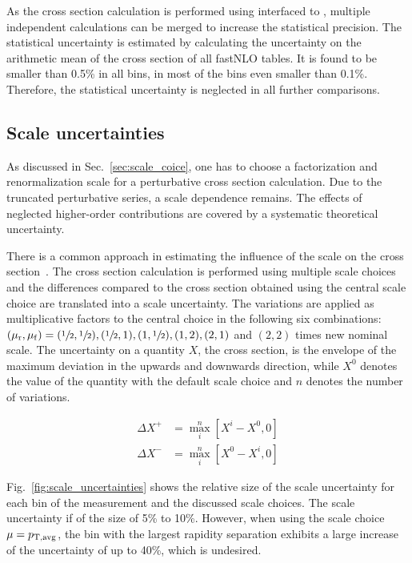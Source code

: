 As the cross section calculation is performed using \fastNLO interfaced to
\NLOJETPP, multiple independent calculations can be merged to increase the
statistical precision. The statistical uncertainty is estimated by calculating
the uncertainty on the arithmetic mean of the cross section of all fastNLO
tables. It is found to be smaller than 0.5\% in all
bins, in most of the bins even smaller than 0.1\%. Therefore, the statistical
uncertainty is neglected in all further comparisons.

\subsection{Scale uncertainties}
\label{sec:scale_uncertainties}

As discussed in Sec.~\ref{sec:scale_coice}, one has to choose a factorization
and renormalization scale for a perturbative cross section calculation. Due to
the truncated perturbative series, a scale dependence remains. The effects of
neglected higher-order contributions are covered by a systematic theoretical
uncertainty.

There is a common approach in estimating the influence of the scale on the cross
section~\cite{Cacciari:2003fi}. The cross section calculation is performed using
multiple scale choices and the differences compared to the cross section
obtained using the central scale choice are translated into a scale uncertainty.
The variations are applied as multiplicative factors to the central choice in
the following six combinations: $(\mu_{\mathrm{r}}, \mu_{\mathrm{f}}) = (\sfrac{1}{2}, \sfrac{1}{2}),
(\sfrac{1}{2}, 1), (1, \sfrac{1}{2}), (1, 2), (2, 1)$ and $(2, 2)$ times new
nominal scale. The uncertainty on a quantity $X$, \eg the cross section, is the
envelope of the maximum deviation in the upwards and downwards direction, while
$X^0$ denotes the value of the quantity with the default scale choice and $n$
denotes the number of variations.

\begin{align*}
    \Delta X^+ &= \max_{i}^{n} \left[ X^i - X^0, 0 \right]\\
    \Delta X^- &= \max_{i}^{n} \left[ X^0 - X^i, 0 \right]
\end{align*}


Fig.~\ref{fig:scale_uncertainties} shows the relative size of the scale
uncertainty for each bin of the measurement and the discussed scale choices. The
scale uncertainty if of the size of 5\% to 10\%. However, when using the scale
choice $\mu=p_{\mathrm{T,avg}}$, the bin with the largest rapidity separation exhibits a large
increase of the uncertainty of up to 40\%, which is undesired.


